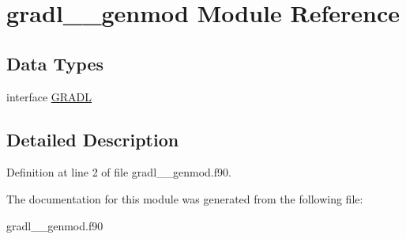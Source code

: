 \hypertarget{classgradl____genmod}{\section{gradl\+\_\+\+\_\+genmod Module Reference}
\label{classgradl____genmod}
}
\subsection*{Data Types}
\begin{DoxyCompactItemize}
\item 
interface \hyperlink{interfacegradl____genmod_1_1_g_r_a_d_l}{G\+R\+A\+D\+L}
\end{DoxyCompactItemize}


\subsection{Detailed Description}


Definition at line 2 of file gradl\+\_\+\+\_\+genmod.\+f90.



The documentation for this module was generated from the following file\+:\begin{DoxyCompactItemize}
\item 
gradl\+\_\+\+\_\+genmod.\+f90\end{DoxyCompactItemize}
